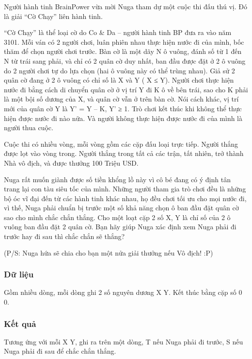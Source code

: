 



   Người hành tinh BrainPower vừa mời Nuga tham dự một cuộc thi đấu thú vị. Đó là giải “Cờ Chạy” liên hành tinh.  

   “Cờ Chạy” là thể loại cờ do Co \& Da – người hành tinh BP đưa ra vào năm 3101. Mỗi ván có 2 người chơi, luân phiên nhau thực hiện nước đi của mình, bốc thăm để chọn người chơi trước. Bàn cờ là một dãy N ô vuông, đánh số từ 1 đến N từ trái sang phải, và chỉ có 2 quân cờ duy nhất, ban đầu được đặt ở 2 ô vuông do 2 người chơi tự do lựa chọn (hai ô vuông này có thể trùng nhau). Giả sử 2 quân cờ đang ở 2 ô vuông có chỉ số là X và Y ( X ≤ Y). Người chơi thực hiện nước đi bằng cách di chuyển quân cờ ở vị trí Y đi K ô về bên trái, sao cho K phải là một bội số dương của X, và quân cờ vẫn ở trên bàn cờ. Nói cách khác, vị trí mới của quân cờ Y là Y’ = Y – K, Y’ ≥ 1. Trò chơi kết thúc khi không thể thực hiện được nước đi nào nữa. Và người không thực hiện được nước đi của mình là người thua cuộc.  

   Cuộc thi có nhiều vòng, mỗi vòng gồm các cặp đấu loại trực tiếp. Người thắng được lọt vào vòng trong. Người thắng trong tất cả các trận, tất nhiên, trở thành Nhà vô địch, và được thưởng 100 Triệu USD.  

   Nuga rất muốn giành được số tiền khổng lồ này vì cô bé đang có ý định tân trang lại con tàu siêu tốc của mình.  Những người tham gia trò chơi đều là những bộ óc vĩ đại đến từ các hành tinh khác nhau, họ đều chơi tối ưu cho mọi nước đi, vì thế, Nuga phải chuẩn bị trước một số khả năng chọn ô ban đầu đặt quân cờ sao cho mình chắc chắn thắng. Cho một loạt cặp 2 số X, Y là chỉ số của 2 ô vuông ban đầu đặt 2 quân cờ. Bạn hãy giúp Nuga xác định xem Nuga phải đi trước hay đi sau thì chắc chắn sẽ thắng?  

   (P/S: Nuga hứa sẽ chia cho bạn một nửa giải thưởng nếu Vô địch! :P)  

\subsubsection{   Dữ liệu  }

   Gồm nhiều dòng, mỗi dòng ghi 2 số nguyên dương X Y. Kết thúc bằng cặp số 0 0.  

\subsubsection{   Kết quả  }

   Tương ứng với mỗi X Y, ghi ra trên một dòng, T nếu Nuga phải đi trước, S nếu Nuga phải đi sau để chắc chắn thắng.  

